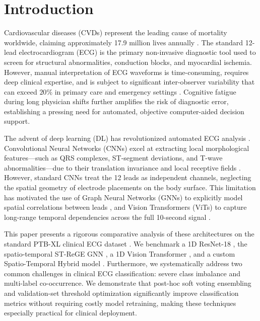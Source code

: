\documentclass[14pt]{extarticle}
\begin{document}
\section{Introduction}
Cardiovascular diseases (CVDs) represent the leading cause of mortality worldwide, claiming approximately 17.9 million lives annually \cite{whocvd}. The standard 12-lead electrocardiogram (ECG) is the primary non-invasive diagnostic tool used to screen for structural abnormalities, conduction blocks, and myocardial ischemia. However, manual interpretation of ECG waveforms is time-consuming, requires deep clinical expertise, and is subject to significant inter-observer variability that can exceed $20\%$ in primary care and emergency settings \cite{hannun2019cardiologist}. Cognitive fatigue during long physician shifts further amplifies the risk of diagnostic error, establishing a pressing need for automated, objective computer-aided decision support.

The advent of deep learning (DL) has revolutionized automated ECG analysis \cite{ribeiro2020automatic}. Convolutional Neural Networks (CNNs) excel at extracting local morphological features---such as QRS complexes, ST-segment deviations, and T-wave abnormalities---due to their translation invariance and local receptive fields \cite{kiranyaz2016real}. However, standard CNNs treat the 12 leads as independent channels, neglecting the spatial geometry of electrode placements on the body surface. This limitation has motivated the use of Graph Neural Networks (GNNs) to explicitly model spatial correlations between leads \cite{zhang2023strege, zhang2021ecggnn}, and Vision Transformers (ViTs) to capture long-range temporal dependencies across the full 10-second signal \cite{vaswani2017attention, dosovitskiy2020image}.

This paper presents a rigorous comparative analysis of these architectures on the standard PTB-XL clinical ECG dataset \cite{wagner2020ptbxl, strodthoff2021deep}. We benchmark a 1D ResNet-18 \cite{ribeiro2020automatic}, the spatio-temporal ST-ReGE GNN \cite{zhang2023strege}, a 1D Vision Transformer \cite{vaid2023foundational}, and a custom Spatio-Temporal Hybrid model \cite{moody2025foundation}. Furthermore, we systematically address two common challenges in clinical ECG classification: severe class imbalance and multi-label co-occurrence. We demonstrate that post-hoc soft voting ensembling and validation-set threshold optimization significantly improve classification metrics without requiring costly model retraining, making these techniques especially practical for clinical deployment.
\end{document}
